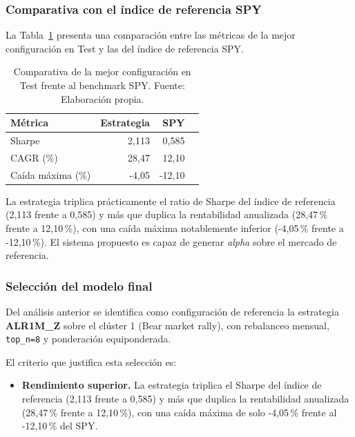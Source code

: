 \subsubsection{Comparativa con el índice de referencia SPY}

La Tabla~\ref{tab:comparativa_spy} presenta una comparación
entre las métricas de la mejor configuración
en Test y las del índice de referencia SPY.

\begin{table}[H]
\centering
\begin{tabular}{lrrr}
\toprule
\textbf{Métrica} & \textbf{Estrategia} & \textbf{SPY} \\
\midrule
Sharpe                & 2,113 & 0,585 \\
CAGR (\%)             & 28,47 & 12,10 \\
Caída máxima (\%)     & -4,05 & -12,10 \\
\bottomrule
\end{tabular}
\caption{Comparativa de la mejor configuración en Test frente al
benchmark SPY. Fuente: Elaboración propia.}
\label{tab:comparativa_spy}
\end{table}

La estrategia triplica prácticamente el ratio de Sharpe
del índice de referencia (2,113 frente a 0,585) y más que duplica
la rentabilidad anualizada (28,47\,\% frente a 12,10\,\%),
con una caída máxima notablemente inferior (-4,05\,\% frente a
-12,10\,\%). El sistema propuesto es capaz de generar
\textit{alpha} sobre el mercado de referencia.


\subsubsection{Selección del modelo final}

Del análisis anterior se identifica como configuración de
referencia la estrategia \textbf{ALR1M\_Z} sobre el clúster 1
(Bear market rally), con rebalanceo mensual,
\texttt{top\_n=8} y ponderación equiponderada.

El criterio que justifica esta selección es:

\begin{itemize}
    \item \textbf{Rendimiento superior.} La estrategia triplica el
    Sharpe del índice de referencia (2,113 frente a 0,585) y más
    que duplica la rentabilidad anualizada (28,47\,\% frente a
    12,10\,\%), con una caída máxima de solo -4,05\,\% frente al
    -12,10\,\% del SPY.

    
\end{itemize}

